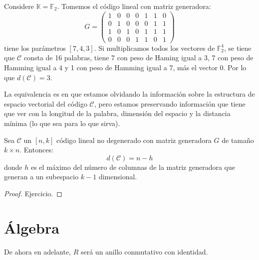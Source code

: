 \documentclass[12pt]{report}
\newcounter{it}
\theoremstyle{largebreak}
\begin{document}
    \begin{exa}
        Considere $\mathbb{K}=\mathbb{F}_2$. Tomemos el código lineal con matriz generadora:
        \begin{equation*}
            G=\left(
                \begin{array}{lcccccr}
                    1 & 0 & 0 & 0 & 1 & 1 & 0 \\
                    0 & 1 & 0 & 0 & 0 & 1 & 1 \\
                    1 & 0 & 1 & 0 & 1 & 1 & 1 \\
                    0 & 0 & 0 & 1 & 1 & 0 & 1 
                \end{array}
            \right)
        \end{equation*}
        tiene los parámetros $[7,4,3]$. Si multiplicamos todos los vectores de $\mathbb{F}_2^4$, se tiene que $\mathcal{C}$ consta de 16 palabras, tiene 7 con peso de Haming igual a 3, 7 con peso de Hamming igual a 4 y 1 con peso de Hamming igual a 7, más el vector 0. Por lo que $d(\mathcal{C})=3$.
    \end{exa}

    \begin{obs}
        La equivalencia es en que estamos olvidando la información sobre la estructura de espacio vectorial del código $\mathcal{C}$, pero estamos preservando información que tiene que ver con la longitud de la palabra, dimensión del espacio y la distancia mínima (lo que sea para lo que sirva).
    \end{obs}

    \begin{excer}
        Sea $\mathcal{C}$ un $[n,k]$ código lineal no degenerado con matriz generadora $G$ de tamaño $k\times n$. Entonces:
        \begin{equation*}
            d(\mathcal{C})=n-h
        \end{equation*}
        donde $h$ es el máximo del número de columnas de la matriz generadora que generan a un subespacio $k-1$ dimensional.
    \end{excer}

    \begin{proof}
        Ejercicio.
    \end{proof}

    \section{Álgebra}

    \begin{obs}
        De ahora en adelante, $R$ será un anillo conmutativo con identidad.
    \end{obs}
\end{document}
